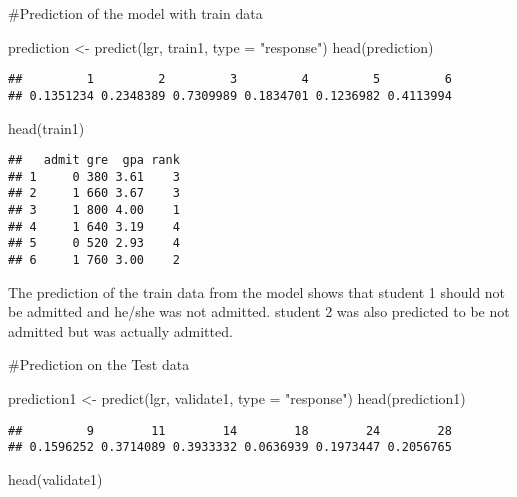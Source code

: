 \documentclass[
]{article}
\newenvironment{Shaded}{\begin{snugshade}}{\end{snugshade}}
\newcommand{\AttributeTok}[1]{\textcolor[rgb]{0.77,0.63,0.00}{#1}}
\newcommand{\FunctionTok}[1]{\textcolor[rgb]{0.00,0.00,0.00}{#1}}
\newcommand{\NormalTok}[1]{#1}
\newcommand{\OtherTok}[1]{\textcolor[rgb]{0.56,0.35,0.01}{#1}}
\newcommand{\StringTok}[1]{\textcolor[rgb]{0.31,0.60,0.02}{#1}}
\begin{document}
\#Prediction of the model with train data

\begin{Shaded}
\begin{Highlighting}[]
\NormalTok{prediction }\OtherTok{\textless{}{-}} \FunctionTok{predict}\NormalTok{(lgr, train1, }\AttributeTok{type =} \StringTok{"response"}\NormalTok{)}
\FunctionTok{head}\NormalTok{(prediction)}
\end{Highlighting}
\end{Shaded}

\begin{verbatim}
##         1         2         3         4         5         6 
## 0.1351234 0.2348389 0.7309989 0.1834701 0.1236982 0.4113994
\end{verbatim}

\begin{Shaded}
\begin{Highlighting}[]
\FunctionTok{head}\NormalTok{(train1)}
\end{Highlighting}
\end{Shaded}

\begin{verbatim}
##   admit gre  gpa rank
## 1     0 380 3.61    3
## 2     1 660 3.67    3
## 3     1 800 4.00    1
## 4     1 640 3.19    4
## 5     0 520 2.93    4
## 6     1 760 3.00    2
\end{verbatim}

The prediction of the train data from the model shows that student 1
should not be admitted and he/she was not admitted. student 2 was also
predicted to be not admitted but was actually admitted.

\#Prediction on the Test data

\begin{Shaded}
\begin{Highlighting}[]
\NormalTok{prediction1 }\OtherTok{\textless{}{-}} \FunctionTok{predict}\NormalTok{(lgr, validate1, }\AttributeTok{type =} \StringTok{"response"}\NormalTok{)}
\FunctionTok{head}\NormalTok{(prediction1)}
\end{Highlighting}
\end{Shaded}

\begin{verbatim}
##         9        11        14        18        24        28 
## 0.1596252 0.3714089 0.3933332 0.0636939 0.1973447 0.2056765
\end{verbatim}

\begin{Shaded}
\begin{Highlighting}[]
\FunctionTok{head}\NormalTok{(validate1)}
\end{Highlighting}
\end{Shaded}
\end{document}
